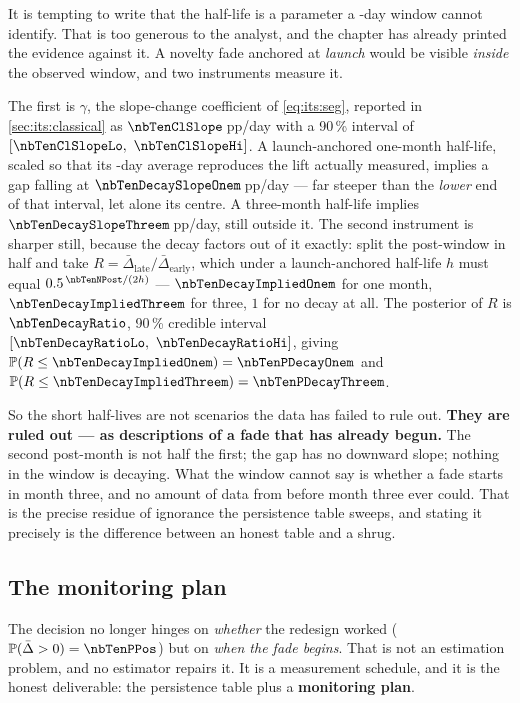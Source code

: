 It is tempting to write that the half-life is a parameter a \nbTenNPost-day window cannot identify.
That is too generous to the analyst, and the chapter has already printed the evidence against it.
A novelty fade anchored at \emph{launch} would be visible \emph{inside} the observed window, and two
instruments measure it.

The first is $\gamma$, the slope-change coefficient of \cref{eq:its:seg}, reported in
\cref{sec:its:classical} as $\nbTenClSlope$\,pp/day with a 90\,\% interval of
$[\nbTenClSlopeLo,\ \nbTenClSlopeHi]$. A launch-anchored one-month half-life, scaled so that its
\nbTenNPost-day average reproduces the lift actually measured, implies a gap falling at
$\nbTenDecaySlopeOnem$\,pp/day --- far steeper than the \emph{lower} end of that interval, let
alone its centre. A three-month half-life implies $\nbTenDecaySlopeThreem$\,pp/day, still outside
it. The second instrument is
sharper still, because the decay factors out of it exactly: split the post-window in half and take
$R = \bar\Delta_{\text{late}} / \bar\Delta_{\text{early}}$, which under a launch-anchored half-life
$h$ must equal $0.5^{\,\nbTenNPost/(2h)}$ --- $\nbTenDecayImpliedOnem$ for one month,
$\nbTenDecayImpliedThreem$ for three, $1$ for no decay at all. The posterior of $R$ is
$\nbTenDecayRatio$, 90\,\% credible interval
$[\nbTenDecayRatioLo,\ \nbTenDecayRatioHi]$, giving $\Prob(R \le \nbTenDecayImpliedOnem) =
\nbTenPDecayOnem$ and $\Prob(R \le \nbTenDecayImpliedThreem) = \nbTenPDecayThreem$.

So the short half-lives are not scenarios the data has failed to rule out. \textbf{They are ruled
out --- as descriptions of a fade that has already begun.} The second post-month is not half the
first; the gap has no downward slope; nothing in the window is decaying. What the window cannot say
is whether a fade starts in month three, and no amount of data from before month three ever could.
That is the precise residue of ignorance the persistence table sweeps, and stating it precisely is
the difference between an honest table and a shrug.

\subsection*{The monitoring plan}

The decision no longer hinges on \emph{whether} the redesign worked ($\Prob(\bar\Delta > 0) =
\nbTenPPos$) but on \emph{when the fade begins}. That is not an estimation problem, and no
estimator repairs it. It is a measurement schedule, and it is the honest deliverable: the
persistence table plus a \textbf{monitoring plan}.

